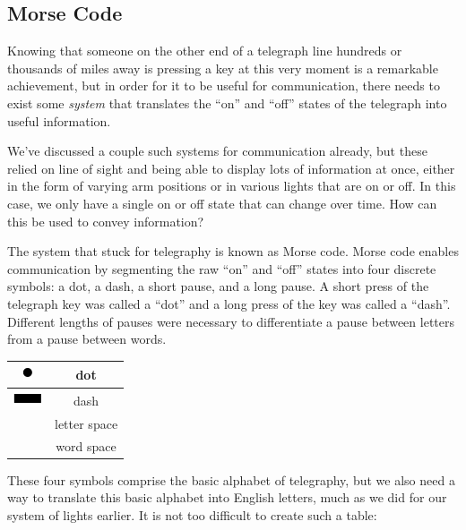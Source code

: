 \documentclass[UTF8]{book}
\newcommand*\thickdash{\includegraphics{thick-dash2}}
\newcommand*\thickdot{\includegraphics{thick-dot2}}
\begin{document}
\begin{CJK}{UTF8}{gbsn}
\section{Morse Code}

Knowing that someone on the other end of a telegraph line hundreds or thousands of miles away is pressing a key at this very moment is a remarkable achievement, but in order for it to be useful for communication, there needs to exist some \emph{system} that translates the ``on'' and ``off'' states of the telegraph into useful information.

We've discussed a couple such systems for communication already, but these relied on line of sight and being able to display lots of information at once, either in the form of varying arm positions or in various lights that are on or off. In this case, we only have a single on or off state that can change over time. How can this be used to convey information?

The system that stuck for telegraphy is known as Morse code. Morse code enables communication by segmenting the raw ``on'' and ``off'' states into four discrete symbols: a dot, a dash, a short pause, and a long pause. A short press of the telegraph key was called a ``dot'' and a long press of the key was called a ``dash''. Different lengths of pauses were necessary to differentiate a pause between letters from a pause between words.

\begin{center}
\begin{tabular}{cc}
\thickdot & dot \\
\hline
\thickdash & dash \\
\hline
[short pause] & letter space \\
\hline
[long pause] & word space \\
\end{tabular}
\end{center}

These four symbols comprise the basic alphabet of telegraphy, but we also need a way to translate this basic alphabet into English letters, much as we did for our system of lights earlier. It is not too difficult to create such a table:


\end{CJK}
\end{document}
